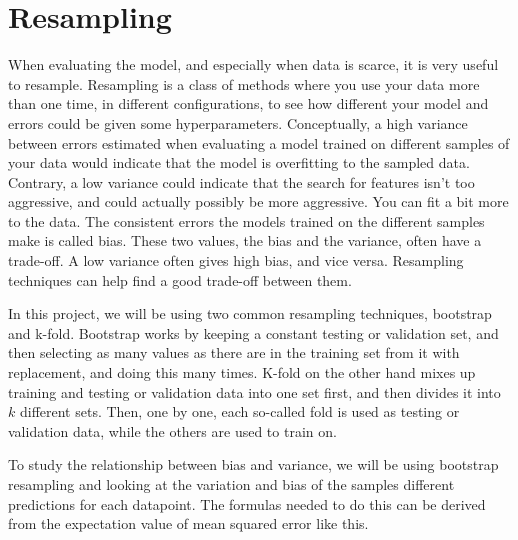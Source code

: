 \documentclass[11pt, a4paper]{report}
\begin{document}
\section{Resampling}

When evaluating the model, and especially when data is scarce, it is very useful to resample. Resampling is a class of methods where you use your data more than one time, in different configurations, to see how different your model and errors could be given some hyperparameters. Conceptually, a high variance between errors estimated when evaluating a model trained on different samples of your data would indicate that the model is overfitting to the sampled data. Contrary, a low variance could indicate that the search for features isn't too aggressive, and could actually possibly be more aggressive. You can fit a bit more to the data. The consistent errors the models trained on the different samples make is called bias. These two values, the bias and the variance, often have a trade-off. A low variance often gives high bias, and vice versa. Resampling techniques can help find a good trade-off between them.

In this project, we will be using two common resampling techniques, bootstrap and k-fold. Bootstrap works by keeping a constant testing or validation set, and then selecting as many values as there are in the training set from it with replacement, and doing this many times. K-fold on the other hand mixes up training and testing or validation data into one set first, and then divides it into $k$ different sets. Then, one by one, each so-called fold is used as testing or validation data, while the others are used to train on.

To study the relationship between bias and variance, we will be using bootstrap resampling and looking at the variation and bias of the samples different predictions for each datapoint. The formulas needed to do this can be derived from the expectation value of mean squared error like this.
\end{document}
